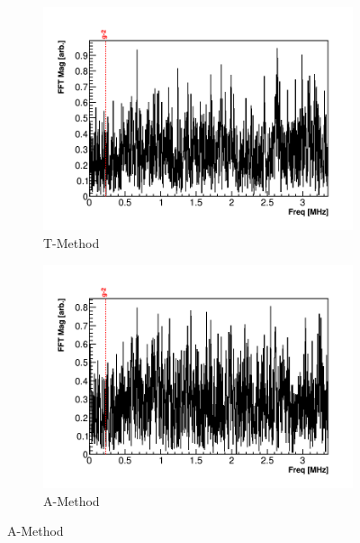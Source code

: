 \begin{figure}
\centering
    \begin{subfigure}[t]{0.45\textwidth}
        \centering
        \includegraphics[width=\textwidth]{FFT_TMethod}
        \caption{T-Method}
    \end{subfigure}
    \hspace{1mm}
    \begin{subfigure}[t]{0.45\textwidth}
        \centering
        \includegraphics[width=\textwidth]{FFT_AMethod}
        \caption{A-Method}
    \end{subfigure}%


\end{figure}
